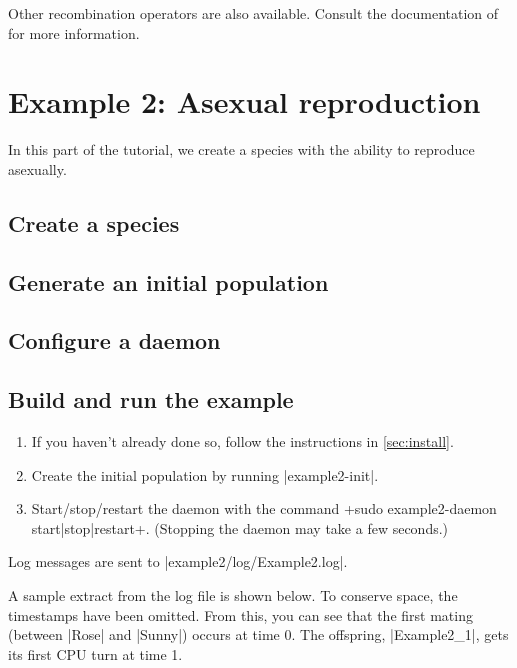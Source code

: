 \documentclass[a4paper,10pt]{report}
\begin{document}
\begin{itemize}
Other recombination operators are also available.
Consult the documentation of 
for more information.

\chapter{Example 2: Asexual reproduction}
\label{sec:plant}

In this part of the tutorial, we create a species with the
ability to reproduce asexually.

\section{Create a species}
\label{sec:species2}



\section{Generate an initial population}
\label{sec:pop2}



\section{Configure a daemon}
\label{sec:daemon2}



\section{Build and run the example}
\label{sec:run2}

\begin{enumerate}
\item If you haven't already done so, follow the instructions in 
\ref{sec:install}.
\item Create the initial population by running |example2-init|.
\item Start/stop/restart the daemon with the command
\UndefineShortVerb{\|}
\DefineShortVerb{\+}
+sudo example2-daemon start|stop|restart+.
\UndefineShortVerb{\+}
\DefineShortVerb{\|}
(Stopping the daemon may take a few seconds.)
\end{enumerate}

Log messages are sent to |example2/log/Example2.log|.

A sample extract from the log file is shown below.
To conserve space, the timestamps have been omitted.
From this, you can see that the first mating (between |Rose| and |Sunny|)
occurs at time 0.
The offspring, |Example2_1|, gets its first CPU turn at time 1.


\end{itemize}
\end{document}

